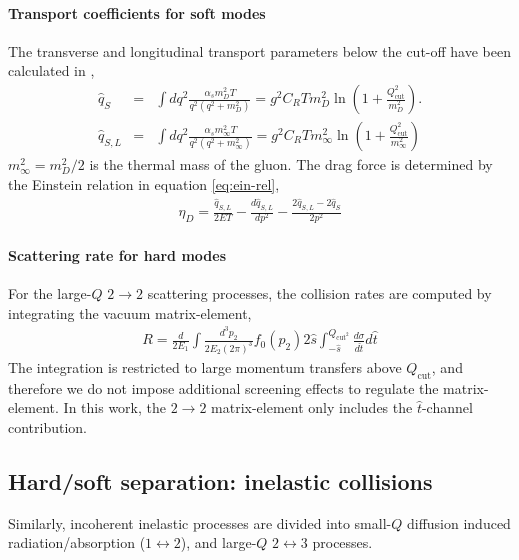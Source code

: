 \paragraph{Transport coefficients for soft modes} The transverse and longitudinal transport parameters below the cut-off have been calculated in \cite{Ghiglieri:2015ala},
\begin{eqnarray}
\hat{q}_S &=& \int dq^2 \frac{\alpha_s m_D^2 T}{q^2 (q^2+m_D^2)} = g^2 C_R T m_D^2  \ln\left(1+\frac{Q_{\textrm{cut}}^2}{m_D^2}\right).
\label{eq:qS} \\
\hat{q}_{S,L} &=& \int dq^2 \frac{\alpha_s m_\infty^2 T}{q^2 (q^2+m_\infty^2)} = g^2 C_R T m_\infty^2  \ln\left(1+\frac{Q_{\textrm{cut}}^2}{m_\infty^2}\right)
\label{eq:qSL} 
\end{eqnarray}
$m_\infty^2 = m_D^2/2$ is the thermal mass of the gluon. 
The drag force is determined by the Einstein relation in equation \ref{eq:ein-rel},
\begin{eqnarray}
\eta_D = \frac{\hat{q}_{S,L}}{2ET} - \frac{d\hat{q}_{S,L}}{dp^2} - \frac{2\hat{q}_{S,L} - 2\hat{q}_S}{2p^2}
\end{eqnarray}

\paragraph{Scattering rate for hard modes} For the large-$Q$ $2\rightarrow 2$ scattering processes, the collision rates are computed by integrating the vacuum matrix-element, 
\begin{eqnarray}
R = \frac{d}{2E_1}\int  \frac{d^3p_2}{2E_2(2\pi)^3} f_0(p_2)2\hat{s} \int_{-\hat{s}}^{Q_{\textrm{cut}^2}}\frac{d\sigma}{d\hat{t}}d\hat{t}
\end{eqnarray}
The integration is restricted to large momentum transfers above $Q_{\textrm{cut}}$, and therefore we do not impose additional screening effects to regulate the matrix-element.
In this work, the $2\rightarrow 2$ matrix-element only includes the $\hat{t}$-channel contribution.

\subsection{Hard/soft separation: inelastic collisions}
Similarly, incoherent inelastic processes are divided into small-$Q$ diffusion induced radiation/absorption ($1\leftrightarrow 2$), and large-$Q$ $2\leftrightarrow 3$ processes.

